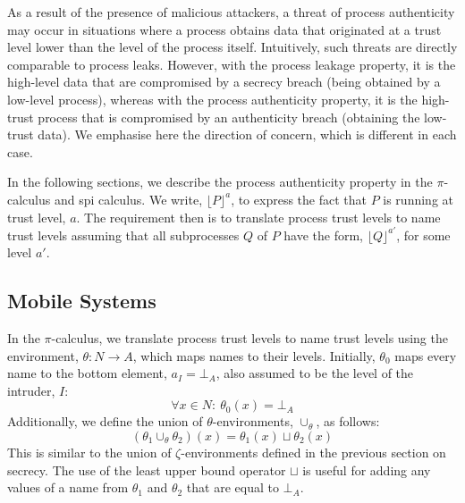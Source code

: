 \documentclass[10pt,a4paper,final,oneside,fleqn]{book}
\begin{document}
As a result of the presence of malicious attackers, a threat of process authenticity may occur in situations where a process obtains data that originated at a trust level lower than the level of the process itself.  Intuitively, such threats are directly comparable to process leaks.  However, with the process leakage property, it is the high-level data that are compromised by a secrecy breach (being obtained by a low-level process), whereas with the process authenticity property, it is the high-trust process that is compromised by an authenticity breach (obtaining the low-trust data).  We emphasise here the direction of concern, which is different in each case.

In the following sections, we describe the process authenticity property in the $\pi$-calculus and spi calculus. We write, $\lfloor P\rfloor^a$, to express the fact that $P$ is running at trust level, $a$. The requirement then is to translate process trust levels to name trust levels assuming that all subprocesses $Q$ of $P$ have the form, $\lfloor Q\rfloor^{a'}$, for some level $a'$.
\subsection{Mobile Systems}
In the $\pi$-calculus, we translate process trust levels to name trust levels using the environment, $\theta: N\to A$, which maps names to their levels. Initially, $\theta_{0}$ maps every name to the bottom element, $a_I=\bot_A$, also assumed to be the level of the intruder, $I$:
\begin{equation*}
\forall x\in N:~\theta_0(x)=\bot_A
\end{equation*}
Additionally, we define the union of $\theta$-environments, $\cup_\theta$, as follows:
\begin{equation*}
(\theta_1\cup_\theta\theta_2)(x)=\theta_1(x)\sqcup\theta_2(x)
\end{equation*}
This is similar to the union of $\zeta$-environments defined in the previous section on secrecy.  The use of the least upper bound operator $\sqcup$ is useful for adding any values of a name from $\theta_1$ and $\theta_2$ that are equal to $\bot_A$.
\end{document}
